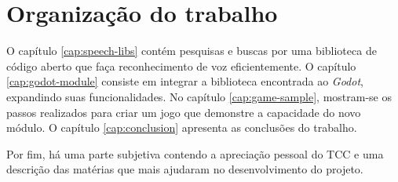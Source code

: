 
\section{Organização do trabalho}

O capítulo \ref{cap:speech-libs} contém pesquisas e buscas por uma biblioteca de código aberto que faça reconhecimento de voz eficientemente. O capítulo \ref{cap:godot-module} consiste em integrar a biblioteca encontrada ao \emph{Godot}, expandindo suas funcionalidades. No capítulo \ref{cap:game-sample}, mostram-se os passos realizados para criar um jogo que demonstre a capacidade do novo módulo. O capítulo \ref{cap:conclusion} apresenta as conclusões do trabalho.

Por fim, há uma parte subjetiva contendo a apreciação pessoal do TCC e uma descrição das matérias que mais ajudaram no desenvolvimento do projeto.
